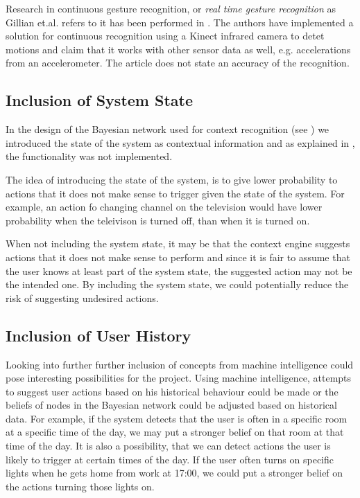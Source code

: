 Research in continuous gesture recognition, or \emph{real time gesture recognition} as Gillian et.al. refers to it has been performed in \cite{gillian2014gesture}. The authors have implemented a solution for continuous recognition using a Kinect infrared camera to detet motions and claim that it works with other sensor data as well, e.g. accelerations from an accelerometer. The article does not state an accuracy of the recognition.

\subsection{Inclusion of System State}

In the design of the Bayesian network used for context recognition (see ) we introduced the state of the system as contextual information and as explained in , the functionality was not implemented.

The idea of introducing the state of the system, is to give lower probability to actions that it does not make sense to trigger given the state of the system. For example, an action fo changing channel on the television would have lower probability when the teleivison is turned off, than when it is turned on. 

When not including the system state, it may be that the context engine suggests actions that it does not make sense to perform and since it is fair to assume that the user knows at least part of the system state, the suggested action may not be the intended one. By including the system state, we could potentially reduce the risk of suggesting undesired actions.

\subsection{Inclusion of User History}

Looking into further further inclusion of concepts from machine intelligence could pose interesting possibilities for the project. Using machine intelligence, attempts to suggest user actions based on his historical behaviour could be made or the beliefs of nodes in the Bayesian network could be adjusted based on historical data. For example, if the system detects that the user is often in a specific room at a specific time of the day, we may put a stronger belief on that room at that time of the day. It is also a possibility, that we can detect actions the user is likely to trigger at certain times of the day. If the user often turns on specific lights when he gets home from work at 17:00, we could put a stronger belief on the actions turning those lights on.

